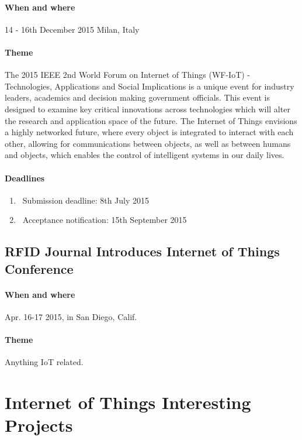 \documentclass[12pt]{article}
\begin{document}
\paragraph {When and where} 14 - 16th December 2015 Milan, Italy

\paragraph {Theme} The 2015 IEEE 2nd World Forum on Internet of Things (WF-IoT) - Technologies, Applications and Social Implications is a unique event for industry leaders, academics and decision making government officials. This event is designed to examine key critical innovations across technologies which will alter the research and application space of the future. The Internet of Things envisions a highly networked future, where every object is integrated to interact with each other, allowing for communications between objects, as well as between humans and objects, which enables the control of intelligent systems in our daily lives.

\paragraph {Deadlines}
\begin{enumerate}
\item\ Submission deadline: 8th July 2015
\item\ Acceptance notification: 15th September 2015
\end{enumerate}

\subsection {RFID Journal Introduces Internet of Things Conference}

\paragraph {When and where} Apr. 16-17 2015, in San Diego, Calif.

\paragraph {Theme} Anything IoT related.


\section{Internet of Things Interesting Projects}
\end{document}

